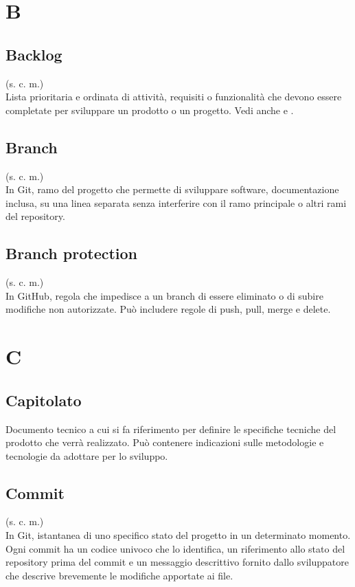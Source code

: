 \section{B}
    \subsection{Backlog}
    (s. c. m.)\\
    Lista prioritaria e ordinata di attività, requisiti o funzionalità che devono 
    essere completate per sviluppare un prodotto o un progetto.
    Vedi anche  e .
    \subsection{Branch} 
    (s. c. m.)\\
    In Git, ramo del progetto che permette di sviluppare software, documentazione inclusa, su una linea separata 
    senza interferire con il ramo principale o altri rami del repository.
    \subsection{Branch protection}
    \label{Branch protection}
    (s. c. m.)\\
    In GitHub, regola che impedisce a un branch di essere eliminato o di subire modifiche
    non autorizzate. Può includere regole di push, pull, merge e delete.
\pagebreak
\section{C}
    \subsection{Capitolato}
    Documento tecnico a cui si fa riferimento per definire le specifiche tecniche 
    del prodotto che verrà realizzato. Può contenere indicazioni sulle metodologie e
    tecnologie da adottare per lo sviluppo.
    \subsection{Commit}
    (s. c. m.)\\
    In Git, istantanea di uno specifico stato del progetto in un determinato momento.
    Ogni commit ha un codice univoco che lo identifica,
    un riferimento allo stato del repository prima del commit e un messaggio descrittivo 
    fornito dallo sviluppatore che descrive brevemente le modifiche apportate ai file.
